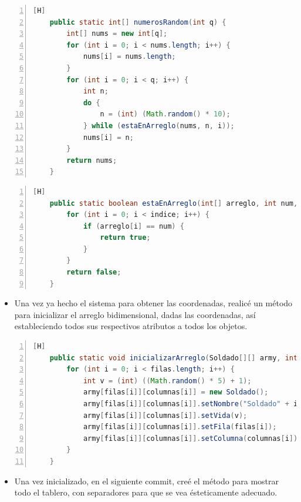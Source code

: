 \documentclass{article}
\begin{document}
	\begin{lstlisting}[language=java,caption={Números aleatorios}, numbers=left][H]
	public static int[] numerosRandom(int q) {
        int[] nums = new int[q];
        for (int i = 0; i < nums.length; i++) {
            nums[i] = nums.length;
        }
        for (int i = 0; i < q; i++) {
            int n;
            do {
                n = (int) (Math.random() * 10);
            } while (estaEnArreglo(nums, n, i));
            nums[i] = n;
        }
        return nums;
    }
	\end{lstlisting}
	\begin{lstlisting}[language=java,caption={Comprobar que no se repitan}, numbers=left][H]
	public static boolean estaEnArreglo(int[] arreglo, int num, int indice) {
        for (int i = 0; i < indice; i++) {
            if (arreglo[i] == num) {
                return true;
            }
        }
        return false;
    }
	\end{lstlisting}
	\begin{itemize}	
		\item Una vez ya hecho el sistema para obtener las coordenadas, realicé un método para inicializar el arreglo bidimensional, dadas las coordenadas, así estableciendo todos sus respectivos atributos a todos los objetos.
	\end{itemize}
	\begin{lstlisting}[language=java,caption={Inicializando el ejército}, numbers=left][H]
	public static void inicializarArreglo(Soldado[][] army, int[] filas, int[] columnas) {
        for (int i = 0; i < filas.length; i++) {
            int v = (int) ((Math.random() * 5) + 1);
            army[filas[i]][columnas[i]] = new Soldado();
            army[filas[i]][columnas[i]].setNombre("Soldado" + i);
            army[filas[i]][columnas[i]].setVida(v);
            army[filas[i]][columnas[i]].setFila(filas[i]);
            army[filas[i]][columnas[i]].setColumna(columnas[i]);
        }
    }
	\end{lstlisting}
	\begin{itemize}	
		\item Una vez inicializado, en el siguiente commit, creé el método para mostrar todo el tablero, con separadores para que se vea ésteticamente adecuado.
	\end{itemize}
\end{document}
